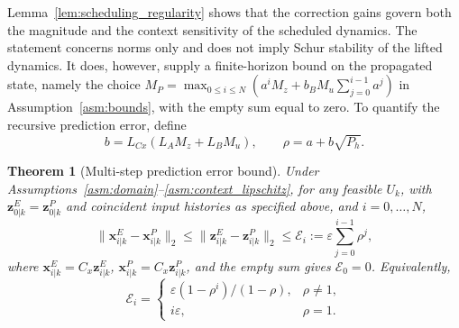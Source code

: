 \documentclass[journal]{IEEEtran}
\newcommand{\vx}{\mathbf{x}}
\newcommand{\vz}{\mathbf{z}}
\newcommand{\norm}[2][]{\mathopen{#1\lVert}#2\mathclose{#1\rVert}}
\theoremstyle{plain}
\newtheorem{theorem}{Theorem}
\theoremstyle{definition}
\theoremstyle{definition}
\begin{document}
Lemma~\ref{lem:scheduling_regularity} shows that the correction gains
govern both the magnitude and the context sensitivity of the scheduled
dynamics. The statement concerns norms only and does not imply Schur
stability of the lifted dynamics. It does, however, supply a
finite-horizon bound on the propagated state, namely the choice
$M_P=\max_{0\le i\le N}(a^iM_z+b_BM_u\sum_{j=0}^{i-1}a^j)$ in
Assumption~\ref{asm:bounds}, with the empty sum equal to zero.
To quantify the recursive prediction error, define
\begin{equation}
b=L_{Cx}(L_AM_z+L_BM_u),\qquad
\rho=a+b\sqrt{P_h}.
\label{eq:rho_definition}
\end{equation}

\begin{theorem}[Multi-step prediction error bound]
\label{thm:prediction_error}
Under Assumptions~\ref{asm:domain}--\ref{asm:context_lipschitz}, for
any feasible $U_k$, with $\vz_{0|k}^E=\vz_{0|k}^P$ and coincident input
histories as specified above, and $i=0,\ldots,N$,
\begin{equation}
\norm{\vx_{i|k}^E-\vx_{i|k}^P}_2
\le\norm{\vz_{i|k}^E-\vz_{i|k}^P}_2
\le\mathcal E_i:=\varepsilon\sum_{j=0}^{i-1}\rho^j,
\label{eq:prediction_error_bound}
\end{equation}
where $\vx_{i|k}^E=C_x\vz_{i|k}^E$,
$\vx_{i|k}^P=C_x\vz_{i|k}^P$, and the empty sum gives $\mathcal E_0=0$.
Equivalently,
\begin{equation}
\mathcal E_i=\begin{cases}
\varepsilon(1-\rho^i)/(1-\rho),&\rho\ne1,\\
i\varepsilon,&\rho=1.
\end{cases}
\label{eq:prediction_error_explicit}
\end{equation}
\end{theorem}
\end{document}
